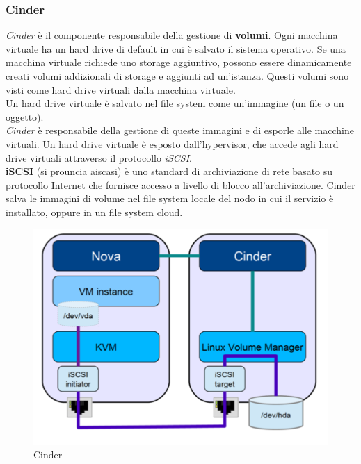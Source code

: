 \documentclass{article}
\begin{document}
\subsubsection{Cinder}
\textit{Cinder} è il componente responsabile della gestione di \textbf{volumi}. Ogni macchina virtuale ha un hard drive di default in cui è salvato il sistema operativo. Se una macchina virtuale richiede uno storage aggiuntivo, possono essere dinamicamente creati volumi addizionali di storage e aggiunti ad un'istanza. Questi volumi sono visti come hard drive virtuali dalla macchina virtuale. \\
Un hard drive virtuale è salvato nel file system come un'immagine (un file o un oggetto). \\
\textit{Cinder} è responsabile della gestione di queste immagini e di esporle alle macchine virtuali. Un hard drive virtuale è esposto dall'hypervisor, che accede agli hard drive virtuali attraverso il protocollo \textit{iSCSI}. \\
\textbf{iSCSI} (si prouncia aiscasi) è uno standard di archiviazione di rete basato su protocollo Internet che fornisce accesso a livello di blocco all'archiviazione.
Cinder salva le immagini di volume nel file system locale del nodo in cui il servizio è installato, oppure in un file system cloud.
\begin{figure}[H]
    \centering
    \includegraphics[scale=0.5]{img/Cinder.png}
    \caption{Cinder}
\end{figure}\noindent
\end{document}
